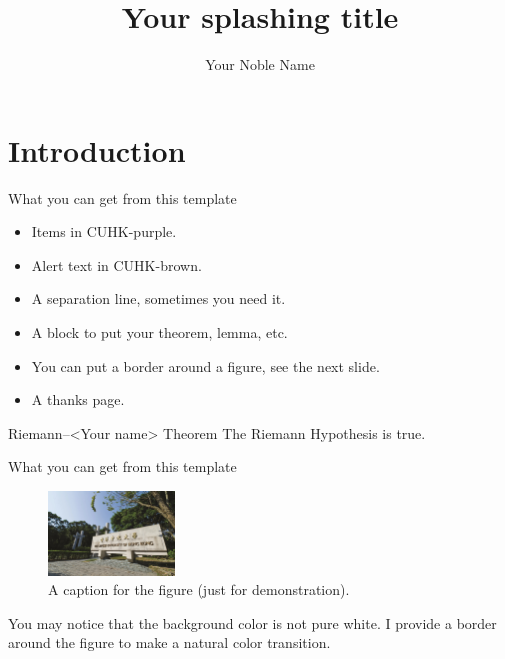 \documentclass[aspectratio=169]{beamer}
\title{Your splashing title}
\author{Your Noble Name}
\institute{Your sweet CUHK}
\begin{document}
\begin{frame}[plain]
  \maketitle
\end{frame}

\section{Introduction}
\begin{frame}{What you can get from this template}
  \begin{itemize}
    \item Items in CUHK-purple.
    \item \alert{Alert text} in CUHK-brown.
    \item A separation line, sometimes you need it.
    \item A block to put your theorem, lemma, etc.
    \item You can put a border around a figure, see the next slide.
    \item A thanks page.
  \end{itemize}

  \MyCUHKline

  \begin{MyCUHKblock}{Riemann--<Your name> Theorem}
    The Riemann Hypothesis is \alert{true}.
  \end{MyCUHKblock}
\end{frame}

\begin{frame}{What you can get from this template}

  \begin{figure}
    \begin{MyCUHKfigure}
      \includegraphics[width=0.3\textwidth]{figs/figure-from-web.jpeg}
    \end{MyCUHKfigure}
    \caption{A caption for the figure (just for demonstration).}
  \end{figure}

  You may notice that the background color is \alert{not} pure white.
  I provide a border around the figure to make a natural color transition.
\end{frame}
\end{document}
